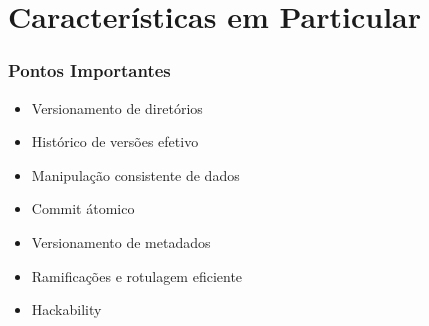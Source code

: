 \documentclass{beamer}
\begin{document}
\section{Caracter\'isticas em Particular}
\begin{frame}
    \frametitle{Pontos Importantes}
    \begin{itemize}
        \item Versionamento de diretórios
        \item Histórico de versões efetivo
        \item Manipulação consistente de dados
        \item Commit \'atomico
        \item Versionamento de metadados
        \item Ramificações e rotulagem eficiente
        \item Hackability
    \end{itemize}
\end{frame}
\end{document}
